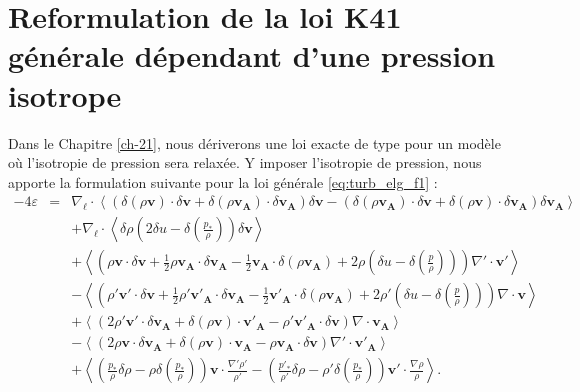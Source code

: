 \section{Reformulation de la loi K41 générale dépendant d'une pression isotrope}
\label{sec-132}

Dans le Chapitre \ref{ch-21}, nous dériverons une loi exacte de type  pour un modèle où l'isotropie de pression sera relaxée. Y imposer l'isotropie de pression, nous apporte la formulation suivante pour la loi générale \eqref{eq:turb_elg_f1} : 
\begin{equation}
\boxed{
\begin{array}{lcl}
\label{eq:turb_elg_f2}-4\varepsilon &=& \nabla_{\boldsymbol{\ell}} \cdot \left<\left(\delta \left(\rho\boldsymbol{v}\right) \cdot \delta \boldsymbol{v}+ \delta \left(\rho\boldsymbol{v_A}\right) \cdot \delta \boldsymbol{v_A}\right) \delta \boldsymbol{v}  -\left(\delta \left(\rho\boldsymbol{v_A}\right) \cdot \delta \boldsymbol{v}  + \delta \left(\rho\boldsymbol{v}\right) \cdot \delta \boldsymbol{v_A}  \right) \delta \boldsymbol{v_A} \right>\\
&& + \nabla_{\boldsymbol{\ell}} \cdot \left<\delta \rho  \left(2\delta u - \delta \left(\frac{p_*}{\rho}\right)\right)\delta \boldsymbol{v}\right> \\
&& +\left< \left(\rho \boldsymbol{v} \cdot \delta \boldsymbol{v} +\frac{1}{2} \rho \boldsymbol{v_A} \cdot \delta \boldsymbol{v_A} -\frac{1}{2} \boldsymbol{v_A} \cdot \delta \left(\rho \boldsymbol{v_A}\right) + 2\rho \left(\delta u - \delta \left(\frac{p}{\rho}\right)\right) \right) \nabla' \cdot \boldsymbol{v'} \right>\\
&& -\left<\left( \rho' \boldsymbol{v'} \cdot \delta \boldsymbol{v} +\frac{1}{2} \rho' \boldsymbol{v'_A} \cdot \delta \boldsymbol{v_A} -\frac{1}{2} \boldsymbol{v'_A} \cdot \delta \left(\rho \boldsymbol{v_A}\right) + 2\rho' \left(\delta u - \delta \left(\frac{p}{\rho}\right)\right)  \right)\nabla \cdot \boldsymbol{v}\right>\\
&&+ \left<\left(2 \rho' \boldsymbol{v'} \cdot \delta \boldsymbol{v_A}+ \delta\left(\rho \boldsymbol{v}\right) \cdot \boldsymbol{v'_A} - \rho' \boldsymbol{v'_A} \cdot \delta \boldsymbol{v}  \right)\nabla \cdot \boldsymbol{v_A}\right>\\
&&- \left<\left(2\rho \boldsymbol{v} \cdot \delta \boldsymbol{v_A} + \delta\left(\rho \boldsymbol{v}\right) \cdot \boldsymbol{v_A} - \rho \boldsymbol{v_A} \cdot \delta \boldsymbol{v}  \right)\nabla' \cdot \boldsymbol{v'_A}\right> \\
&&+  \left< \left(\frac{p_*}{\rho} \delta \rho - \rho \delta \left(\frac{p_*}{\rho}\right)  \right)\boldsymbol{v} \cdot \frac{\nabla' \rho'}{\rho'} - \left(\frac{p'_*}{\rho'} \delta \rho - \rho' \delta \left(\frac{p_*}{\rho}\right)  \right)  \boldsymbol{v'} \cdot \frac{\nabla \rho}{\rho} \right>.
\end{array}}
\end{equation} 
